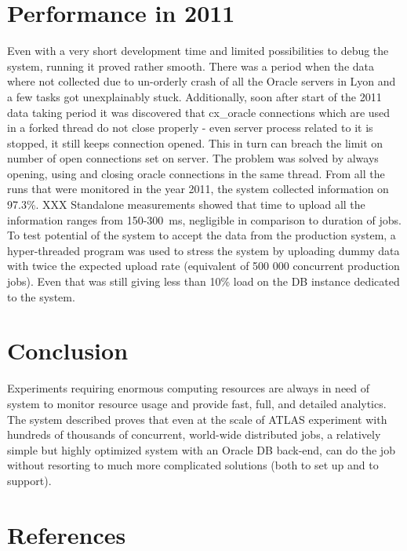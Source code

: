 \documentclass[a4paper]{jpconf}
\begin{document}
\section{Performance in 2011}
Even with a very short development time and limited possibilities to debug the system, running it proved rather smooth. There was a period when the data where not collected due to un-orderly crash of all the Oracle servers in Lyon and a few tasks got unexplainably stuck. Additionally, soon after start of the 2011 data taking period it was discovered that cx\_oracle connections which are used in a forked thread do not close properly - even server process related to it is stopped, it still keeps connection opened. This in turn can breach the limit on number of open connections set on server. The problem was solved by always opening, using and closing oracle connections in the same thread.
From all the runs that were monitored in the year 2011, the system collected information on 97.3\%. XXX
Standalone measurements showed that time to upload all the information ranges from 150-300~ms, negligible in comparison to duration of jobs. To test potential of the system to accept the data from the production system, a hyper-threaded program was used to stress the system by uploading dummy data with twice the expected upload rate (equivalent of 500 000 concurrent production jobs). Even that was still giving less than 10\% load on the DB instance dedicated to the system.


\section{Conclusion}
Experiments requiring enormous computing resources are always in need of system to monitor resource usage and provide fast, full, and detailed analytics. The system described proves that even at the scale of ATLAS experiment with hundreds of thousands of concurrent, world-wide distributed jobs, a relatively simple but highly optimized system with an Oracle DB back-end, can do the job without resorting to much more complicated solutions (both to set up and to support).

\section*{References}

  
\end{document}
